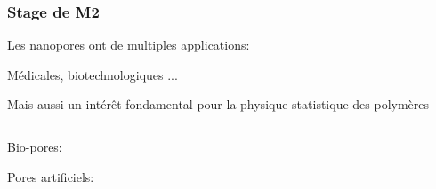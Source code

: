 \documentclass{beamer}
\begin{document}
\frame %
{
  \frametitle{Stage de M2}
  
   \begin{itemize}
  \begin{center}
  
 
\item<1-> Les nanopores ont de multiples applications:
  
  Médicales, biotechnologiques ...
  
  \medskip
  
\item<2-> Mais aussi un intérêt fondamental pour la physique statistique des polymères
  
\end{center}
\end{itemize}

\begin{columns}
\begin{column}{0.6\textwidth}

   \begin{itemize}
  \begin{center}
 \item<3-> Bio-pores:
 \medskip
 \medskip
 \medskip
 \medskip
 \medskip
 \medskip
 \medskip
 \medskip
 \medskip

 
 
 \item<4-> Pores artificiels:
  \end{center}
\end{itemize}

\end{column}
\begin{column}{0.6\textwidth}
\begin{center}


\end{center}
\end{column}
\end{columns}






}
\end{document}
